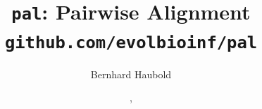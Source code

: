 \documentclass[a4paper]{article}
\begin{document}
\pagestyle{noweb}

\title{\texttt{pal}: Pairwise Alignment\\
\small \texttt{github.com/evolbioinf/pal}}
\author{Bernhard Haubold}
\date{\!\!, }
\maketitle
\tableofcontents





\end{document}

